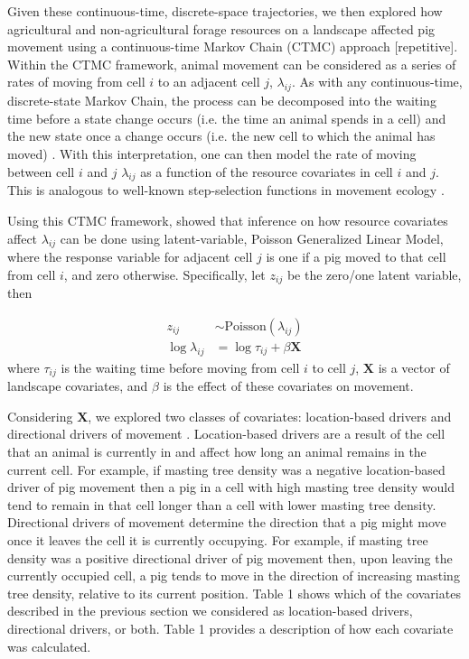 \documentclass[a4paper]{article}
\begin{document}

Given these continuous-time, discrete-space trajectories, we then explored how agricultural and non-agricultural forage resources on a landscape affected pig movement using a continuous-time Markov Chain (CTMC) approach \cite{Hanks2015} [repetitive]. Within the CTMC framework, animal movement can be considered as a series of rates of moving from cell $i$ to an adjacent cell $j$, $\lambda_{ij}$.  As with any continuous-time, discrete-state Markov Chain, the process can be decomposed into the waiting time before a state change occurs (i.e. the time an animal spends in a cell) and the new state once a change occurs (i.e. the new cell to which the animal has moved) \citep{Allen2003a}.  With this interpretation, one can then model the rate of moving between cell $i$ and $j$ $\lambda_{ij}$ as a function of the resource covariates in cell $i$ and $j$.  This is analogous to well-known step-selection functions in movement ecology \citep{Thurfjell2014}.

Using this CTMC framework, \cite{Hanks2015} showed that inference on how resource covariates affect $\lambda_{ij}$ can be done using latent-variable, Poisson Generalized Linear Model, where the response variable for adjacent cell $j$ is one if a pig moved to that cell from cell $i$, and zero otherwise. Specifically, let $z_{ij}$ be the zero/one latent variable, then

\begin{align}
  z_{ij} &\sim \text{Poisson}(\lambda_{ij}) \\
  \log \lambda_{ij} &= \log{\tau_{ij}} + \beta \mathbf{X}
  \label{pglm}
\end{align}
where $\tau_{ij}$ is the waiting time before moving from cell $i$ to cell $j$, $\mathbf{X}$ is a vector of landscape covariates, and $\beta$ is the effect of these covariates on movement.  

Considering $\mathbf{X}$, we explored two classes of covariates: location-based drivers and directional drivers of movement \citep{Hanks2015}.  Location-based drivers are a result of the cell that an animal is currently in and affect how long an animal remains in the current cell.  For example, if masting tree density was a negative location-based driver of pig movement then a pig in a cell with high masting tree density would tend to remain in that cell longer than a cell with lower masting tree density. Directional drivers of movement determine the direction that a pig might move once it leaves the cell it is currently occupying.  For example, if masting tree density was a positive directional driver of pig movement then, upon leaving the currently occupied cell, a pig tends to move in the direction of increasing masting tree density, relative to its current position. Table 1 shows which of the covariates described in the previous section we considered as location-based drivers, directional drivers, or both.  Table 1 provides a description of how each covariate was calculated.
\end{document}
